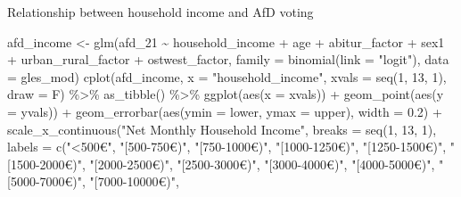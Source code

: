 \documentclass[
]{article}
\newenvironment{Shaded}{\begin{snugshade}}{\end{snugshade}}
\newcommand{\AttributeTok}[1]{\textcolor[rgb]{0.77,0.63,0.00}{#1}}
\newcommand{\DecValTok}[1]{\textcolor[rgb]{0.00,0.00,0.81}{#1}}
\newcommand{\FloatTok}[1]{\textcolor[rgb]{0.00,0.00,0.81}{#1}}
\newcommand{\FunctionTok}[1]{\textcolor[rgb]{0.00,0.00,0.00}{#1}}
\newcommand{\NormalTok}[1]{#1}
\newcommand{\OtherTok}[1]{\textcolor[rgb]{0.56,0.35,0.01}{#1}}
\newcommand{\SpecialCharTok}[1]{\textcolor[rgb]{0.00,0.00,0.00}{#1}}
\newcommand{\StringTok}[1]{\textcolor[rgb]{0.31,0.60,0.02}{#1}}
\begin{document}
Relationship between household income and AfD voting

\begin{Shaded}
\begin{Highlighting}[]
\NormalTok{afd\_income }\OtherTok{\textless{}{-}} \FunctionTok{glm}\NormalTok{(afd\_21 }\SpecialCharTok{\textasciitilde{}}\NormalTok{ household\_income }\SpecialCharTok{+}\NormalTok{ age }\SpecialCharTok{+}\NormalTok{ abitur\_factor }\SpecialCharTok{+}\NormalTok{ sex1 }\SpecialCharTok{+}\NormalTok{ urban\_rural\_factor }\SpecialCharTok{+}\NormalTok{ ostwest\_factor, }\AttributeTok{family =} \FunctionTok{binomial}\NormalTok{(}\AttributeTok{link =} \StringTok{"logit"}\NormalTok{), }\AttributeTok{data =}\NormalTok{ gles\_mod)}
\FunctionTok{cplot}\NormalTok{(afd\_income, }\AttributeTok{x =} \StringTok{"household\_income"}\NormalTok{,}
      \AttributeTok{xvals =} \FunctionTok{seq}\NormalTok{(}\DecValTok{1}\NormalTok{, }\DecValTok{13}\NormalTok{, }\DecValTok{1}\NormalTok{), }\AttributeTok{draw =}\NormalTok{ F) }\SpecialCharTok{\%\textgreater{}\%}
  \FunctionTok{as\_tibble}\NormalTok{() }\SpecialCharTok{\%\textgreater{}\%}
  \FunctionTok{ggplot}\NormalTok{(}\FunctionTok{aes}\NormalTok{(}\AttributeTok{x =}\NormalTok{ xvals)) }\SpecialCharTok{+}
  \FunctionTok{geom\_point}\NormalTok{(}\FunctionTok{aes}\NormalTok{(}\AttributeTok{y =}\NormalTok{ yvals)) }\SpecialCharTok{+}
  \FunctionTok{geom\_errorbar}\NormalTok{(}\FunctionTok{aes}\NormalTok{(}\AttributeTok{ymin =}\NormalTok{ lower, }\AttributeTok{ymax =}\NormalTok{ upper), }\AttributeTok{width =} \FloatTok{0.2}\NormalTok{) }\SpecialCharTok{+}
  \FunctionTok{scale\_x\_continuous}\NormalTok{(}\StringTok{"Net Monthly Household Income"}\NormalTok{,}
                     \AttributeTok{breaks =} \FunctionTok{seq}\NormalTok{(}\DecValTok{1}\NormalTok{, }\DecValTok{13}\NormalTok{, }\DecValTok{1}\NormalTok{),}
                     \AttributeTok{labels =} \FunctionTok{c}\NormalTok{(}\StringTok{"\textless{}500€"}\NormalTok{, }\StringTok{"[500{-}750€)"}\NormalTok{,}
                                \StringTok{"[750{-}1000€)"}\NormalTok{, }\StringTok{"[1000{-}1250€)"}\NormalTok{, }
                                \StringTok{"[1250{-}1500€)"}\NormalTok{, }\StringTok{"[1500{-}2000€)"}\NormalTok{,}
                                \StringTok{"[2000{-}2500€)"}\NormalTok{, }\StringTok{"[2500{-}3000€)"}\NormalTok{,}
                                \StringTok{"[3000{-}4000€)"}\NormalTok{, }\StringTok{"[4000{-}5000€)"}\NormalTok{,}
                                \StringTok{"[5000{-}7000€)"}\NormalTok{, }\StringTok{"[7000{-}10000€)"}\NormalTok{,}

\end{Highlighting}
\end{Shaded}
\end{document}
